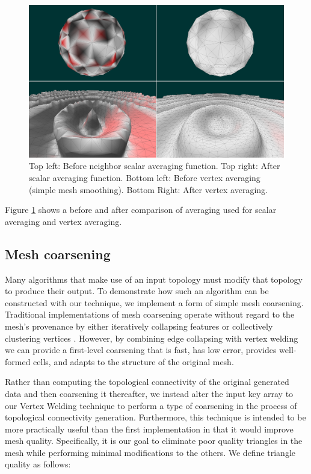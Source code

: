 \documentclass[journal]{vgtc}                %
\begin{document}
\begin{figure}[!ht]
\includegraphics[width=\columnwidth]{averaging}
\caption{Top left: Before neighbor scalar averaging function. Top right: After scalar averaging function. Bottom left: Before vertex averaging (simple mesh smoothing). Bottom Right: After vertex averaging.}
\label{fig:averaging}
\end{figure}

Figure \ref{fig:averaging} shows a before and after comparison of averaging used for scalar averaging and vertex averaging.



\subsection{Mesh coarsening}

Many algorithms that make use of an input topology must modify that topology to produce their output. To demonstrate how such an algorithm can be constructed with our technique, we implement a form of simple mesh coarsening. Traditional implementations of mesh coarsening operate without regard to the mesh's provenance by either iteratively collapsing features \cite{Potter2011} or collectively clustering vertices \cite{DeCoro2007}.  However, by combining edge collapsing with vertex welding we can provide a first-level coarsening that is fast, has low error, provides well-formed cells, and adapts to the structure of the original mesh.

Rather than computing the topological connectivity of the original generated data and then coarsening it thereafter, we instead alter the input key array to our Vertex Welding technique to perform a type of coarsening in the process of topological connectivity generation. Furthermore, this technique is intended to be more practically useful than the first implementation in that it would improve mesh quality. Specifically, it is our goal to eliminate poor quality triangles in the mesh while performing minimal modifications to the others. We define triangle quality as follows:
\end{document}
